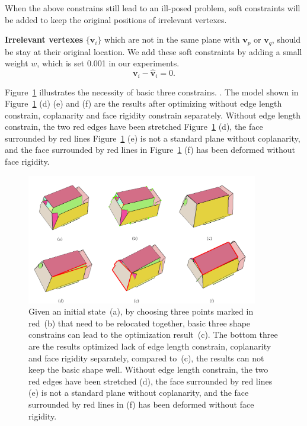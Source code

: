 When the above constrains still lead to an ill-posed problem, soft constraints will be added to keep the original positions of irrelevant vertexes. 


\noindent
\textbf{Irrelevant vertexes} $\{\mathbf{v}_i\}$ which are not in the same plane with $\mathbf{v}_p$ or $\mathbf{v}_q$, should be stay at their original location. 
We add these soft constraints by adding a small weight $w$, which is set 0.001 in our experiments. 
\begin{equation}
\mathbf{v}_i - \mathbf{\hat{v}}_i = 0.
\label{equ:irrelevant}
\end{equation}

Figure~\ref{fig:constrain} illustrates the necessity of basic three constrains.
{. The model shown in Figure~\ref{fig:constrain} (d) (e) and (f) are the results after optimizing without edge length constrain, coplanarity and face rigidity constrain separately. Without edge length constrain, the two red edges have been stretched Figure~\ref{fig:constrain} (d), the face surrounded by red lines Figure~\ref{fig:constrain} (e) is not a standard plane without coplanarity, and the face surrounded by red lines in Figure~\ref{fig:constrain} (f) has been deformed without face rigidity.}

\begin{figure}
	\centering
	\includegraphics[width=0.9\textwidth]{images/constrain.jpg}
	\caption{Given an initial state~(a), by choosing three points marked in red~(b) that need to be relocated together, basic three shape constrains can lead to the optimization result~(c). The bottom three are the results optimized lack of edge length constrain, coplanarity and face rigidity separately, compared to~(c), the results can not keep the basic shape well. Without edge length constrain, the two red edges have been stretched (d), the face surrounded by red lines (e) is not a standard plane without coplanarity, and the face surrounded by red lines in (f) has been deformed without face rigidity.}
	\label{fig:constrain}
\end{figure}

